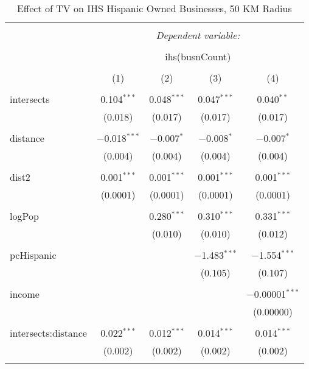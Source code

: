 
\begin{table}[!htbp] \centering 
  \caption{Effect of TV on IHS Hispanic Owned Businesses, 50 KM Radius} 
  \label{} 
\begin{tabular}{@{\extracolsep{-5pt}}lcccc} 
\\[-1.8ex]\hline 
\hline \\[-1.8ex] 
 & \multicolumn{4}{c}{\textit{Dependent variable:}} \\ 
\cline{2-5} 
\\[-1.8ex] & \multicolumn{4}{c}{ihs(busnCount)} \\ 
\\[-1.8ex] & (1) & (2) & (3) & (4)\\ 
\hline \\[-1.8ex] 
 intersects & 0.104$^{***}$ & 0.048$^{***}$ & 0.047$^{***}$ & 0.040$^{**}$ \\ 
  & (0.018) & (0.017) & (0.017) & (0.017) \\ 
  & & & & \\ 
 distance & $-$0.018$^{***}$ & $-$0.007$^{*}$ & $-$0.008$^{*}$ & $-$0.007$^{*}$ \\ 
  & (0.004) & (0.004) & (0.004) & (0.004) \\ 
  & & & & \\ 
 dist2 & 0.001$^{***}$ & 0.001$^{***}$ & 0.001$^{***}$ & 0.001$^{***}$ \\ 
  & (0.0001) & (0.0001) & (0.0001) & (0.0001) \\ 
  & & & & \\ 
 logPop &  & 0.280$^{***}$ & 0.310$^{***}$ & 0.331$^{***}$ \\ 
  &  & (0.010) & (0.010) & (0.012) \\ 
  & & & & \\ 
 pcHispanic &  &  & $-$1.483$^{***}$ & $-$1.554$^{***}$ \\ 
  &  &  & (0.105) & (0.107) \\ 
  & & & & \\ 
 income &  &  &  & $-$0.00001$^{***}$ \\ 
  &  &  &  & (0.00000) \\ 
  & & & & \\ 
 intersects:distance & 0.022$^{***}$ & 0.012$^{***}$ & 0.014$^{***}$ & 0.014$^{***}$ \\ 
  & (0.002) & (0.002) & (0.002) & (0.002) \\ 
  & & & & \\ 

\end{tabular}
\end{table}
